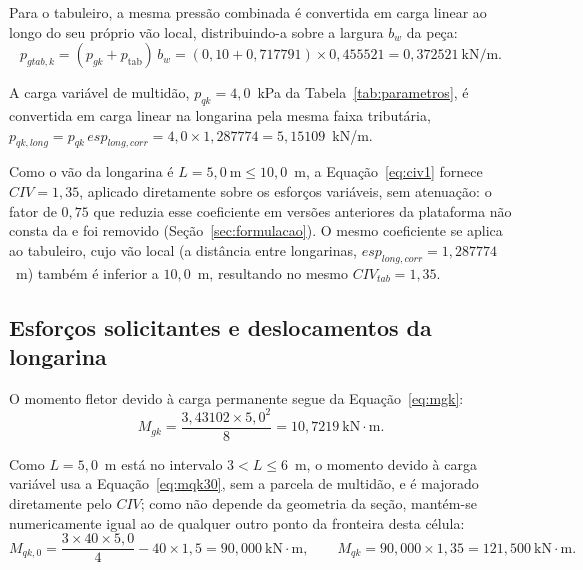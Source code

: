 \begin{appendices}
Para o tabuleiro, a mesma pressão combinada é convertida em carga linear ao longo do seu próprio vão local, distribuindo-a sobre a largura $b_w$ da peça:
\begin{equation*}
p_{gtab,k} = (p_{gk} + p_{\mathrm{tab}})\,b_w = (0{,}10 + 0{,}717791) \times 0{,}455521 = 0{,}372521~\text{kN/m}.
\end{equation*}

A carga variável de multidão, $p_{qk} = 4{,}0$~kPa da Tabela~\ref{tab:parametros}, é convertida em carga linear na longarina pela mesma faixa tributária, $p_{qk,long} = p_{qk}\,esp_{long,corr} = 4{,}0 \times 1{,}287774 = 5{,}15109$~kN/m.

Como o vão da longarina é $L = 5{,}0~\text{m} \leq 10{,}0$~m, a Equação~\eqref{eq:civ1} fornece $CIV = 1{,}35$, aplicado diretamente sobre os esforços variáveis, sem atenuação: o fator de $0{,}75$ que reduzia esse coeficiente em versões anteriores da plataforma não consta da \textcite{nbr7188} e foi removido (Seção~\ref{sec:formulacao}).
O mesmo coeficiente se aplica ao tabuleiro, cujo vão local (a distância entre longarinas, $esp_{long,corr} = 1{,}287774$~m) também é inferior a $10{,}0$~m, resultando no mesmo $CIV_{tab} = 1{,}35$.

\subsection{Esforços solicitantes e deslocamentos da longarina}

O momento fletor devido à carga permanente segue da Equação~\eqref{eq:mgk}:
\begin{equation*}
M_{gk} = \frac{3{,}43102 \times 5{,}0^2}{8} = 10{,}7219~\text{kN}\cdot\text{m}.
\end{equation*}

Como $L = 5{,}0$~m está no intervalo $3 < L \leq 6$~m, o momento devido à carga variável usa a Equação~\eqref{eq:mqk30}, sem a parcela de multidão, e é majorado diretamente pelo $CIV$; como não depende da geometria da seção, mantém-se numericamente igual ao de qualquer outro ponto da fronteira desta célula:
\begin{equation*}
M_{qk,0} = \frac{3 \times 40 \times 5{,}0}{4} - 40 \times 1{,}5 = 90{,}000~\text{kN}\cdot\text{m}, \qquad M_{qk} = 90{,}000 \times 1{,}35 = 121{,}500~\text{kN}\cdot\text{m}.
\end{equation*}


\end{appendices}
